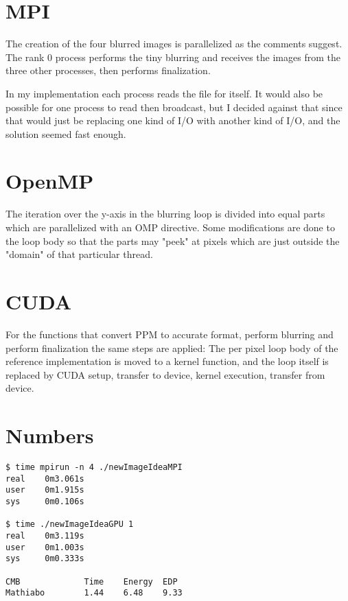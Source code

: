 \section*{MPI}
The creation of the four blurred images is parallelized as the comments suggest.
The rank 0 process performs the tiny blurring and receives the images from the three other processes,
then performs finalization.

In my implementation each process reads the file for itself.
It would also be possible for one process to read then broadcast,
but I decided against that since that would just be replacing one kind of I/O with another kind of I/O, and the solution seemed fast enough.

\section*{OpenMP}
The iteration over the y-axis in the blurring loop is divided into equal parts which are parallelized with an OMP directive.
Some modifications are done to the loop body so that the parts may "peek" at pixels which are just outside the "domain" of that particular thread.

\section*{CUDA}
For the functions that convert PPM to accurate format, perform blurring and perform finalization the same steps are applied:
The per pixel loop body of the reference implementation is moved to a kernel function,
and the loop itself is replaced by CUDA setup, transfer to device, kernel execution, transfer from device.

\section*{Numbers}
\begin{verbatim}
$ time mpirun -n 4 ./newImageIdeaMPI
real    0m3.061s
user    0m1.915s
sys     0m0.106s

$ time ./newImageIdeaGPU 1
real    0m3.119s
user    0m1.003s
sys     0m0.333s

CMB             Time    Energy  EDP
Mathiabo        1.44    6.48    9.33
\end{verbatim}

